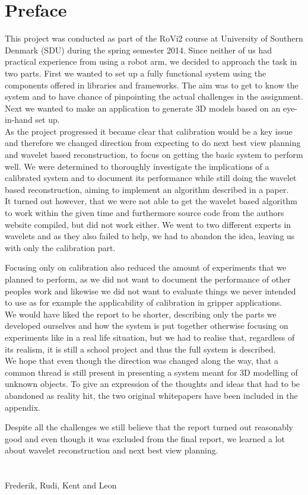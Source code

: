 \chapter*{Preface}
This project was conducted as part of the RoVi2 course at University of Southern Denmark (SDU) during the spring semester 2014. Since neither of us had practical experience from using a robot arm, we decided to approach the task in two parts. First we wanted to set up a fully functional system using the components offered in libraries and frameworks. The aim was to get to know the system and to have chance of pinpointing the actual challenges in the assignment. Next we wanted to make an application to generate 3D models based on an eye-in-hand set up.\\

As the project progressed it became clear that calibration would be a key issue and therefore we changed direction from expecting to do next best view planning and wavelet based reconstruction, to focus on getting the basic system to perform well. We were determined to thoroughly investigate the implications of a calibrated system and to document its performance while still doing the wavelet based reconstruction, aiming to implement an algorithm described in a paper. \\

It turned out however, that we were not able to get the wavelet based algorithm to work within the given time and furthermore source code from the authors website compiled, but did not work either. We went to two different experts in wavelets and as they also failed to help, we had to abandon the idea, leaving us with only the calibration part.

Focusing only on calibration also reduced the amount of experiments that we planned to perform, as we did not want to document the performance of other peoples work and likewise we did not want to evaluate things we never intended to use as for example the applicability of calibration in gripper applications. \\

We would have liked the report to be shorter, describing only the parts we developed ourselves and how the system is put together otherwise focusing on experiments like in a real life situation, but we had to realise that, regardless of its realism, it is still a school project and thus the full system is described.\\

We hope that even though the direction was changed along the way, that a common thread is still present in presenting a system meant for 3D modelling of unknown objects. To give an expression of the thoughts and ideas that had to be abandoned as reality hit, the two original whitepapers have been included in the appendix.

Despite all the challenges we still believe that the report turned out reasonably good and even though it was excluded from the final report, we learned a lot about wavelet reconstruction and next best view planning.\\
 \\
  \\
 Frederik, Rudi, Kent and Leon